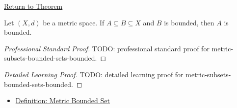 \newpage
{}
\label{prf:metric-subsets-bounded-sets-bounded}

\begin{remark*}[Return]
\hyperref[thm:metric-subsets-bounded-sets-bounded]{Return to Theorem}
\end{remark*}

\begin{theorem*}
Let \((X,d)\) be a metric space.  If \(A\subseteq B\subseteq X\) and \(B\) is
bounded, then \(A\) is bounded.
\end{theorem*}

\begin{proof}[Professional Standard Proof]
\LRAProofBodyStart
TODO: professional standard proof for metric-subsets-bounded-sets-bounded.
\end{proof}

\begin{proof}[Detailed Learning Proof]
\LRAProofBodyStart
TODO: detailed learning proof for metric-subsets-bounded-sets-bounded.
\end{proof}

\begin{remark*}
\end{remark*}

\begin{dependencies}
\begin{itemize}
  \item \hyperref[def:metric-bounded-set]{Definition: Metric Bounded Set}
\end{itemize}
\end{dependencies}

\clearpage
